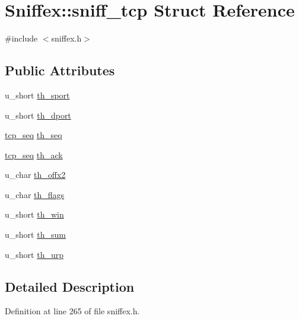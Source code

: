\hypertarget{struct_sniffex_1_1sniff__tcp}{}\section{Sniffex\+:\+:sniff\+\_\+tcp Struct Reference}
\label{struct_sniffex_1_1sniff__tcp}


{\ttfamily \#include $<$sniffex.\+h$>$}

\subsection*{Public Attributes}
\begin{DoxyCompactItemize}
\item 
u\+\_\+short \hyperlink{struct_sniffex_1_1sniff__tcp_a3cbc5a34aaffbb66d2e37060bd2ea9b6}{th\+\_\+sport}
\item 
u\+\_\+short \hyperlink{struct_sniffex_1_1sniff__tcp_a98f86dbef1d01db2bd032e1fe99342eb}{th\+\_\+dport}
\item 
\hyperlink{class_sniffex_a83629f6a3ec687dd2bb381e9bf157d4f}{tcp\+\_\+seq} \hyperlink{struct_sniffex_1_1sniff__tcp_a7adabab3aaed105f0e075d3ce9ad523d}{th\+\_\+seq}
\item 
\hyperlink{class_sniffex_a83629f6a3ec687dd2bb381e9bf157d4f}{tcp\+\_\+seq} \hyperlink{struct_sniffex_1_1sniff__tcp_a3c946baf5941e2e12af8b56a2570eece}{th\+\_\+ack}
\item 
u\+\_\+char \hyperlink{struct_sniffex_1_1sniff__tcp_a27045544602ef965e5a50025f42fbd1d}{th\+\_\+offx2}
\item 
u\+\_\+char \hyperlink{struct_sniffex_1_1sniff__tcp_a2bef60aa797ee914836f6b0007dc3ebb}{th\+\_\+flags}
\item 
u\+\_\+short \hyperlink{struct_sniffex_1_1sniff__tcp_aa8b7d8b1967e81a255ec9362f681c721}{th\+\_\+win}
\item 
u\+\_\+short \hyperlink{struct_sniffex_1_1sniff__tcp_a69830e35f22fcd1b9051afbd4e633fc0}{th\+\_\+sum}
\item 
u\+\_\+short \hyperlink{struct_sniffex_1_1sniff__tcp_a9f030cb6718b8d828f242d0464560761}{th\+\_\+urp}
\end{DoxyCompactItemize}


\subsection{Detailed Description}


Definition at line 265 of file sniffex.\+h.



